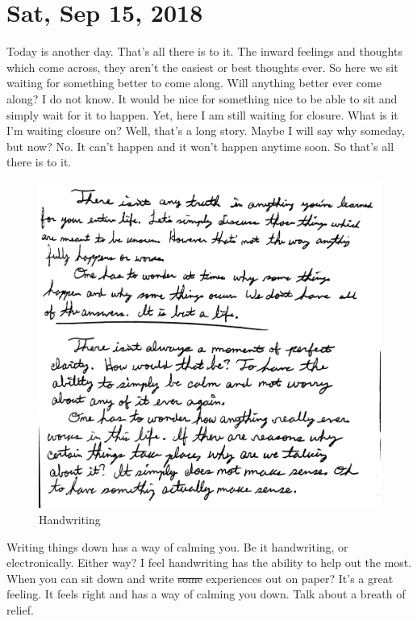 \section{Sat, Sep 15, 2018}

Today is another day. That's all there is to it. The inward feelings and thoughts
which come across, they aren't the easiest or best thoughts ever. So here we sit
waiting for something better to come along. Will anything better ever come along? I
do not know. It would be nice for something nice to be able to sit and simply wait
for it to happen. Yet, here I am still waiting for closure. What is it I'm waiting
closure on? Well, that's a long story. Maybe I will say why someday, but now? No. It
can't happen and it won't happen anytime soon. So that's all there is to it.

\begin{figure}[h!]
  \centering
  \includegraphics[width=.5\linewidth]{2018/images/handwriting.jpg}
  \caption{Handwriting}
  \label{fig:handwriting}
\end{figure}

Writing things down has a way of calming you. Be it handwriting, or electronically.
Either way? I feel handwriting has the ability to help out the most. When you can sit
down and write \st{some} experiences out on paper? It's a great feeling. It feels
right and has a way of calming you down. Talk about a breath of relief.